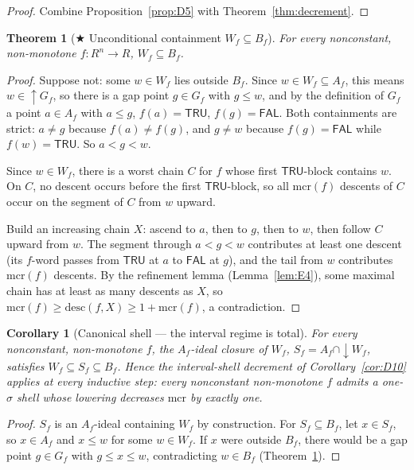 \documentclass[11pt]{article}
\newtheorem{theorem}{Theorem}
\newtheorem{corollary}{Corollary}
\theoremstyle{remark}
\newcommand{\FAL}{\ensuremath{\mathsf{FAL}}}
\newcommand{\TRU}{\ensuremath{\mathsf{TRU}}}
\newcommand{\mcr}{\ensuremath{\mathrm{mcr}}}
\newcommand{\desc}{\mathrm{desc}}
\begin{document}
\begin{proof}
Combine Proposition~\ref{prop:D5} with Theorem~\ref{thm:decrement}.
\end{proof}

\begin{theorem}[$\bigstar$ Unconditional containment $W_f\subseteq B_f$]
\label{thm:WB}
For every nonconstant, non-monotone $f:R^n\to R$, $W_f\subseteq B_f$.
\end{theorem}

\begin{proof}
Suppose not: some $w\in W_f$ lies outside $B_f$. Since
$w\in W_f\subseteq A_f$, this means $w\in{\uparrow}G_f$, so there is a gap
point $g\in G_f$ with $g\le w$, and by the definition of $G_f$ a point
$a\in A_f$ with $a\le g$, $f(a)=\TRU$, $f(g)=\FAL$. Both containments are
strict: $a\ne g$ because $f(a)\ne f(g)$, and $g\ne w$ because $f(g)=\FAL$
while $f(w)=\TRU$. So $a<g<w$.

Since $w\in W_f$, there is a worst chain $C$ for $f$ whose first
$\TRU$-block contains $w$. On $C$, no descent occurs before the first
$\TRU$-block, so all $\mcr(f)$ descents of $C$ occur on the segment of $C$
from $w$ upward.

Build an increasing chain $X$: ascend to $a$, then to $g$, then to $w$,
then follow $C$ upward from $w$. The segment through $a<g<w$ contributes at
least one descent (its $f$-word passes from $\TRU$ at $a$ to $\FAL$ at
$g$), and the tail from $w$ contributes $\mcr(f)$ descents. By the
refinement lemma (Lemma~\ref{lem:E4}), some maximal chain has at least as
many descents as $X$, so $\mcr(f)\ge\desc(f,X)\ge 1+\mcr(f)$, a
contradiction.
\end{proof}

\begin{corollary}[Canonical shell --- the interval regime is total]
\label{cor:D12}
For every nonconstant, non-monotone $f$, the $A_f$-ideal closure of $W_f$,
$S_f=A_f\cap{\downarrow}W_f$, satisfies $W_f\subseteq S_f\subseteq B_f$.
Hence the interval-shell decrement of Corollary~\ref{cor:D10} applies at
every inductive step: every nonconstant non-monotone $f$ admits a
one-$\sigma$ shell whose lowering decreases $\mcr$ by exactly one.
\end{corollary}

\begin{proof}
$S_f$ is an $A_f$-ideal containing $W_f$ by construction. For
$S_f\subseteq B_f$, let $x\in S_f$, so $x\in A_f$ and $x\le w$ for some
$w\in W_f$. If $x$ were outside $B_f$, there would be a gap point
$g\in G_f$ with $g\le x\le w$, contradicting $w\in B_f$
(Theorem~\ref{thm:WB}).
\end{proof}
\end{document}
